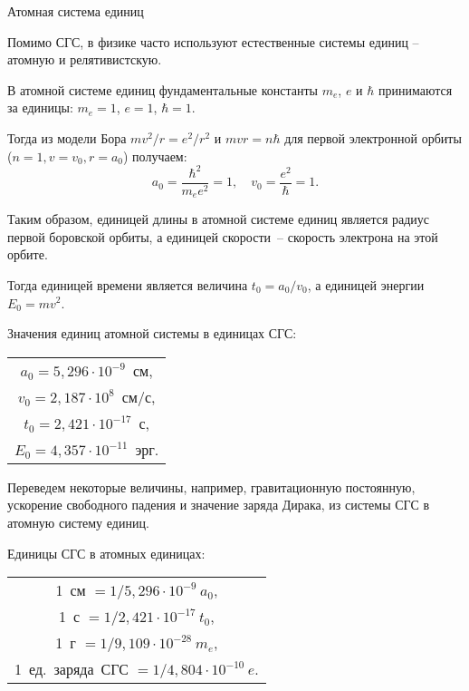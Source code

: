 \documentclass[14pt,a4paper]{extarticle}
\makeatletter
\renewcommand\subsection{\@startsection{subsection}{2}{\z@}{2ex}{2ex}
  {\normalfont\normalsize\bfseries}}
\makeatother
\begin{document}
  \subsection{Атомная система единиц}

  Помимо СГС, в физике часто используют естественные системы единиц -- атомную и
  релятивистскую.

  В атомной системе единиц фундаментальные константы \( m_e \), \( e \) и
  \( \hbar \) принимаются за единицы: \( m_e = 1 \), \( e = 1 \),
  \( \hbar = 1 \).

  Тогда из модели Бора \( mv^2 / r = e^2 / r^2 \) и
  \( mvr = n\hbar \) для первой электронной орбиты (\( n = 1, v = v_0,
  r = a_0 \)) получаем:
  \[
    a_0 = \frac{\hbar^2}{m_e e^2} = 1, \quad
      v_0 = \frac{e^2}{\hbar} = 1.
  \]

  Таким образом, единицей длины в атомной системе единиц является радиус первой
  боровской орбиты, а единицей скорости~-- скорость электрона на этой орбите.

  Тогда единицей времени является величина \( t_0 = a_0 / v_0 \), а единицей
  энергии \( E_0 = mv^2 \).

  Значения единиц атомной системы в единицах СГС:
  \begin{table}[h!]
    \center
    \begin{tabular}{c}
      \( a_0 = 5,\!296 \cdot 10^{-9} \)~см, \\
      \( v_0 = 2,\!187 \cdot 10^8 \)~см/с, \\
      \( t_0 = 2,\!421 \cdot 10^{-17} \)~с, \\
      \( E_0 = 4,\!357 \cdot 10^{-11} \)~эрг. \\
    \end{tabular}
  \end{table}

  Переведем некоторые величины, например, гравитационную постоянную, ускорение
  свободного падения и значение заряда Дирака, из системы СГС в атомную систему
  единиц.

  Единицы СГС в атомных единицах:
  \begin{table}[h!]
    \center
    \begin{tabular}{c}
      1~см \( = 1 / 5,\!296 \cdot 10^{-9}~a_0 \), \\
      1~с \( = 1 / 2,\!421 \cdot 10^{-17}~t_0 \), \\
      1~г \( = 1 / 9,\!109 \cdot 10^{-28}~m_e \), \\
      1~ед.~заряда~СГС \( = 1 / 4,\!804 \cdot 10^{-10}~e \). \\
    \end{tabular}
  \end{table}
\end{document}
